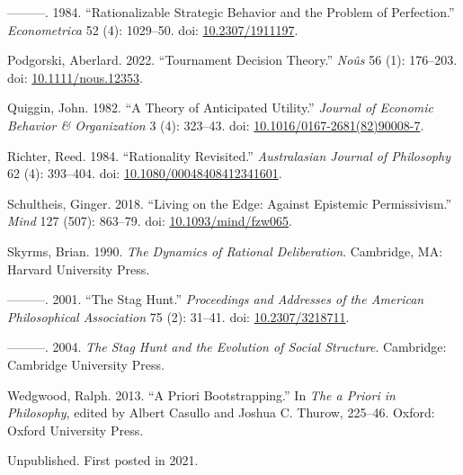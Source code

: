 \documentclass[
  11pt,
  letterpaper,
  DIV=11,
  numbers=noendperiod,
  twoside]{scrartcl}
\newlength{\cslhangindent}
\newenvironment{CSLReferences}[2] %
 {\begin{list}{}{%
  \setlength{\itemindent}{0pt}
  \setlength{\leftmargin}{0pt}
  \setlength{\parsep}{0pt}
  \ifodd #1
   \setlength{\leftmargin}{\cslhangindent}
   \setlength{\itemindent}{-1\cslhangindent}
  \fi
  \setlength{\itemsep}{#2\baselineskip}}}
 {\end{list}}
\begin{document}
\begin{CSLReferences}{1}{0}
---------. 1984. {``Rationalizable Strategic Behavior and the Problem of
Perfection.''} \emph{Econometrica} 52 (4): 1029--50. doi:
\href{https://doi.org/10.2307/1911197}{10.2307/1911197}.

Podgorski, Aberlard. 2022. {``Tournament Decision Theory.''}
\emph{No{û}s} 56 (1): 176--203. doi:
\href{https://doi.org/10.1111/nous.12353}{10.1111/nous.12353}.

Quiggin, John. 1982. {``A Theory of Anticipated Utility.''}
\emph{Journal of Economic Behavior \& Organization} 3 (4): 323--43. doi:
\href{https://doi.org/10.1016/0167-2681(82)90008-7}{10.1016/0167-2681(82)90008-7}.

Richter, Reed. 1984. {``Rationality Revisited.''} \emph{Australasian
Journal of Philosophy} 62 (4): 393--404. doi:
\href{https://doi.org/10.1080/00048408412341601}{10.1080/00048408412341601}.

Schultheis, Ginger. 2018. {``Living on the Edge: Against Epistemic
Permissivism.''} \emph{Mind} 127 (507): 863--79. doi:
\href{https://doi.org/10.1093/mind/fzw065}{10.1093/mind/fzw065}.

Skyrms, Brian. 1990. \emph{The Dynamics of Rational Deliberation}.
Cambridge, MA: Harvard University Press.

---------. 2001. {``The Stag Hunt.''} \emph{Proceedings and Addresses of
the American Philosophical Association} 75 (2): 31--41. doi:
\href{https://doi.org/10.2307/3218711}{10.2307/3218711}.

---------. 2004. \emph{The Stag Hunt and the Evolution of Social
Structure}. Cambridge: {C}ambridge {U}niversity {P}ress.

Wedgwood, Ralph. 2013. {``A Priori Bootstrapping.''} In \emph{The a
Priori in Philosophy}, edited by Albert Casullo and Joshua C. Thurow,
225--46. Oxford: Oxford University Press.

\end{CSLReferences}



Unpublished. First posted in 2021.
\end{document}
